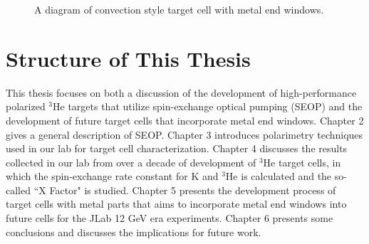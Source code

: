 \begin{figure}[t!]\label{metal_end_windows}
	\centering
	\caption{{A diagram of convection style target cell with metal end windows. }}
	\label{metal_end_windows}
\end{figure}

\section{Structure of This Thesis}

This thesis focuses on both a discussion of the development of high-performance polarized $^3$He targets that utilize spin-exchange optical pumping (SEOP) and the development of future target cells that incorporate metal end windows. Chapter 2 gives a general description of SEOP. Chapter 3 introduces polarimetry techniques used in our lab for target cell characterization. Chapter 4 discusses the results collected in our lab from over a decade of development of $^3$He target cells, in which the spin-exchange rate constant for K and $^3$He is calculated and the so-called ``X Factor" is studied. Chapter 5 presents the development process of target cells with metal parts that aims to incorporate metal end windows into future cells for the JLab 12 GeV era experiments. Chapter 6 presents some conclusions and discusses the implications for future work.













